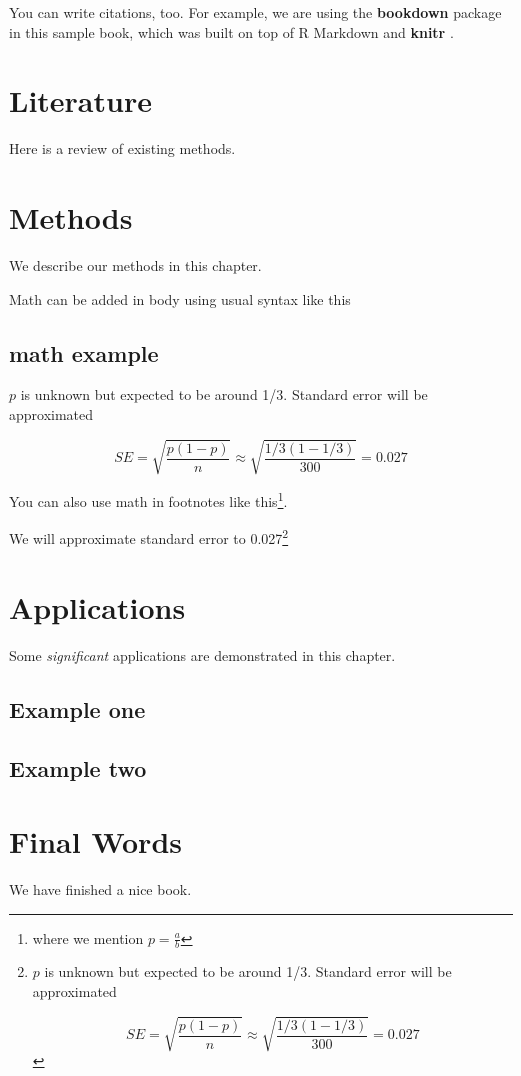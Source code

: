 \documentclass[
]{book}
\begin{document}
You can write citations, too. For example, we are using the \textbf{bookdown} package \citep{R-bookdown} in this sample book, which was built on top of R Markdown and \textbf{knitr} \citep{xie2015}.

\chapter{Literature}\label{literature}

Here is a review of existing methods.

\chapter{Methods}\label{methods}

We describe our methods in this chapter.

Math can be added in body using usual syntax like this

\section{math example}\label{math-example}

\(p\) is unknown but expected to be around 1/3. Standard error will be approximated

\[
SE = \sqrt{\frac{p(1-p)}{n}} \approx \sqrt{\frac{1/3 (1 - 1/3)} {300}} = 0.027
\]

You can also use math in footnotes like this\footnote{where we mention \(p = \frac{a}{b}\)}.

We will approximate standard error to 0.027\footnote{\(p\) is unknown but expected to be around 1/3. Standard error will be approximated

  \[
  SE = \sqrt{\frac{p(1-p)}{n}} \approx \sqrt{\frac{1/3 (1 - 1/3)} {300}} = 0.027
  \]}

\chapter{Applications}\label{applications}

Some \emph{significant} applications are demonstrated in this chapter.

\section{Example one}\label{example-one}

\section{Example two}\label{example-two}

\chapter{Final Words}\label{final-words}

We have finished a nice book.


\end{document}
